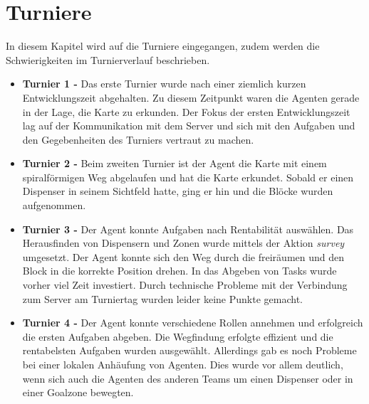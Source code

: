 \section{Turniere}
In diesem Kapitel wird auf die Turniere eingegangen, zudem werden die Schwierigkeiten im Turnierverlauf beschrieben.

\begin{itemize}
    \item \textbf{Turnier 1 -} 
	Das erste Turnier wurde nach einer ziemlich kurzen Entwicklungszeit abgehalten. Zu diesem Zeitpunkt waren die Agenten gerade in der Lage, die Karte zu erkunden. Der Fokus der ersten Entwicklungszeit lag auf der Kommunikation mit dem Server und sich mit den Aufgaben und den Gegebenheiten des Turniers vertraut zu machen. \newline
	
	
	\item \textbf{Turnier 2 -} Beim zweiten Turnier ist der Agent die Karte mit einem spiralförmigen Weg abgelaufen und hat die Karte erkundet. Sobald er einen Dispenser in seinem Sichtfeld hatte, ging er hin und die Blöcke wurden aufgenommen. \newline

	
	\item \textbf{Turnier 3 -} Der Agent konnte Aufgaben nach Rentabilität auswählen. Das Herausfinden von Dispensern und Zonen wurde mittels der Aktion \emph{survey} umgesetzt. Der Agent konnte sich den Weg durch die \Obstacles freiräumen und den Block in die korrekte Position drehen. In das Abgeben von Tasks wurde vorher viel Zeit investiert. Durch technische Probleme mit der Verbindung zum Server am Turniertag wurden leider keine Punkte gemacht. \newline
	
	\item \textbf{Turnier 4 -} Der Agent konnte verschiedene Rollen annehmen und erfolgreich die ersten Aufgaben abgeben. Die Wegfindung erfolgte effizient und die rentabelsten Aufgaben wurden ausgewählt. Allerdings gab es noch Probleme bei einer lokalen Anhäufung von Agenten. Dies wurde vor allem deutlich, wenn sich auch die Agenten des anderen Teams um einen Dispenser oder in einer Goalzone bewegten.\newline
	

\end{itemize}
